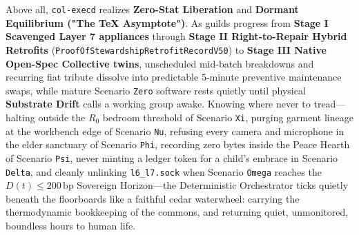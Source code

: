 Above all, \texttt{col-execd} realizes \textbf{Zero-Stat Liberation} and \textbf{Dormant Equilibrium ("The TeX Asymptote")}. As guilds progress from
\textbf{Stage I Scavenged Layer 7 appliances} through \textbf{Stage II Right-to-Repair Hybrid Retrofits} (\texttt{ProofOfStewardshipRetrofitRecordV50})
to \textbf{Stage III Native Open-Spec Collective twins}, unscheduled mid-batch breakdowns and recurring fiat tribute dissolve into predictable 5-minute
preventive maintenance swaps, while mature Scenario \texttt{Zero} software rests quietly until physical \textbf{Substrate Drift} calls a working group
awake. Knowing where never to tread---halting outside the $R_0$ bedroom threshold of Scenario \texttt{Xi}, purging garment lineage at the workbench edge
of Scenario \texttt{Nu}, refusing every camera and microphone in the elder sanctuary of Scenario \texttt{Phi}, recording zero bytes inside the Peace
Hearth of Scenario \texttt{Psi}, never minting a ledger token for a child's embrace in Scenario \texttt{Delta}, and cleanly unlinking
\texttt{l6\_l7.sock} when Scenario \texttt{Omega} reaches the $D(t) \le 200\,\mathrm{bp}$ Sovereign Horizon---the Deterministic Orchestrator ticks
quietly beneath the floorboards like a faithful cedar waterwheel: carrying the thermodynamic bookkeeping of the commons, and returning quiet,
unmonitored, boundless hours to human life.
